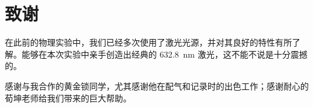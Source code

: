 \documentclass[aps,pre,12pt,preprint,%
	onecolumn,showpacs,showkeys,nofootinbib]{revtex4-1}
\begin{document}
\section{致谢}
	在此前的物理实验中，我们已经多次使用了激光光源，并对其良好的特性有所了解。能够在本次实验中亲手创造出经典的 \SI{632.8}{\nm} 激光，这不能不说是十分震撼的。
	
	感谢与我合作的黄金锁同学，尤其感谢他在配气和记录时的出色工作；感谢耐心的荀坤老师给我们带来的巨大帮助。

\setlength{\bibsep}{2pt}
\linespread{1.2}\selectfont



\clearpage
\end{document}
